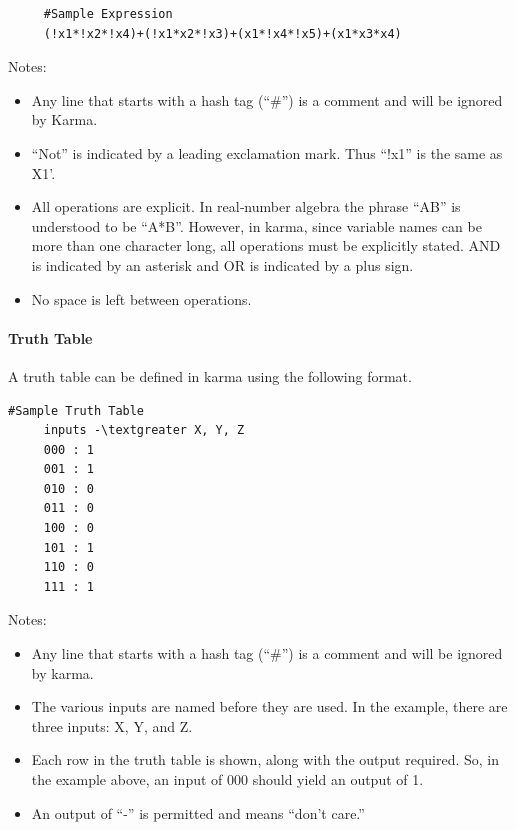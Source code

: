 \begin{verbatim}
     #Sample Expression
     (!x1*!x2*!x4)+(!x1*x2*!x3)+(x1*!x4*!x5)+(x1*x3*x4)
\end{verbatim}

Notes:

\begin{itemize}
	\item Any line that starts with a hash tag (``\#'') is a comment and will be ignored by Karma.
	\item ``Not'' is indicated by a leading exclamation mark. Thus ``!x1'' is the same as X1'.
	\item All operations are explicit. In real‐number algebra the phrase ``AB'' is understood to be ``A*B''. However, in \gls{karma}, since variable names can be more than one character long, all operations must be explicitly stated. AND is indicated by an asterisk and OR is indicated by a plus sign.
	\item No space is left between operations.
\end{itemize}

\paragraph{Truth Table}

A truth table can be defined in \gls{karma} using the following format.

\begin{Verbatim}[commandchars=\\\{\}]
     #Sample Truth Table 
     inputs -\textgreater X, Y, Z 
     000 : 1
     001 : 1 
     010 : 0 
     011 : 0 
     100 : 0 
     101 : 1 
     110 : 0 
     111 : 1
\end{Verbatim}

Notes:

\begin{itemize}
	\item Any line that starts with a hash tag (``\#'') is a comment and will be ignored by \gls{karma}.
	\item The various inputs are named before they are used. In the example, there are three inputs: X, Y, and Z.
	\item Each row in the truth table is shown, along with the output required. So, in the example above, an input of 000 should yield an output of 1.
	\item An output of ``-'' is permitted and means ``don't care.''
\end{itemize}

